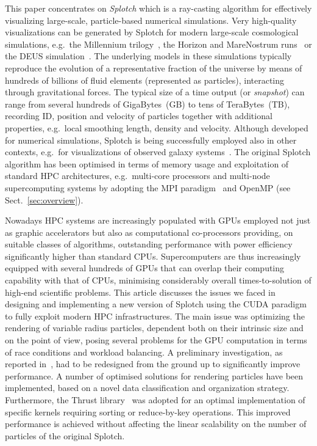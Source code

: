 \documentclass[preprint,5pt]{elsarticle}
\begin{document}
This paper concentrates on {\it Splotch} \cite{2008NJPh...10l5006D} \cite{splotch-web} which is a ray-casting algorithm for effectively visualizing large-scale, particle-based numerical simulations. Very high-quality visualizations can be generated by Splotch for modern large-scale cosmological simulations, e.g.\ the Millennium trilogy~\cite{millennium}, the Horizon and MareNostrum runs~\cite{horizon} or the DEUS simulation~\cite{deus}. The underlying models in these simulations typically reproduce the evolution of a representative fraction of the universe by means of hundreds of billions of fluid elements (represented as particles), interacting through gravitational forces. The typical size of a time output (or {\it snapshot}) can range from several hundreds of GigaBytes~(GB) to tens of TeraBytes~(TB), recording ID, position and velocity of particles together with additional properties, e.g.\ local smoothing length, density and velocity. Although developed for numerical simulations, Splotch is being successfully employed also in other contexts, e.g.\ for visualizations of observed galaxy systems~\cite{m83-vis}.
The original Splotch algorithm has been optimised in terms of memory usage and exploitation of standard HPC architectures, e.g.\ multi-core processors and multi-node supercomputing systems by adopting the MPI paradigm~\cite{jin:high-performance} and OpenMP (see Sect.~\ref{sec:overview}).

Nowadays HPC systems are increasingly populated with GPUs employed not just as graphic accelerators but also as computational co-processors providing, on suitable classes of algorithms, outstanding performance with power efficiency significantly higher than standard CPUs. Supercomputers are thus increasingly equipped with several hundreds of GPUs that can overlap their computing capability with that of CPUs, minimising considerably overall times-to-solution of high-end scientific problems. This article discusses the issues we faced in designing and implementing a new version of Splotch using the CUDA paradigm~\cite{cudaurl} to fully exploit modern HPC infrastructures. The main issue was optimizing the rendering of variable radius particles, dependent both on their intrinsic size and on the point of view, posing several problems for the GPU computation in terms of race conditions and workload balancing. A preliminary investigation, as reported in~\cite{jin:high-performance}, had to be redesigned from the ground up to significantly improve performance. A number of optimised solutions for rendering particles have been implemented, based on a novel data classification and organization strategy. Furthermore, the Thrust library~\cite{thrusturl} was adopted for an optimal implementation of specific kernels requiring sorting or reduce-by-key operations.
This improved performance is achieved without affecting the linear scalability on the number of particles of the original Splotch. 
\end{document}
